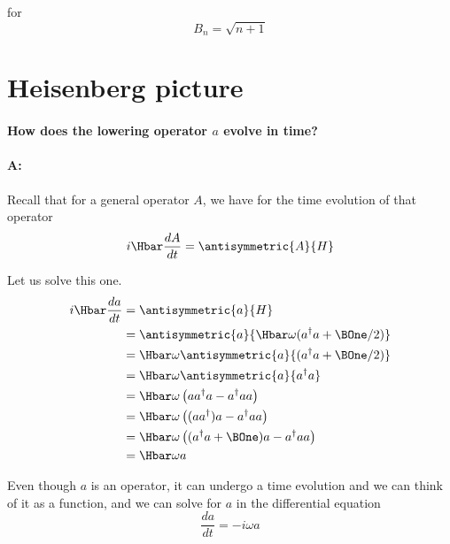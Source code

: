 for
\begin{equation}\label{eqn:PHY356FLecture11:260}
B_n = \sqrt{n + 1}
\end{equation}

\section{Heisenberg picture}

\paragraph{How does the lowering operator \(a\) evolve in time?}

\paragraph{A:} Recall that for a general operator \(A\), we have for the time evolution of that operator
%
\begin{equation}\label{eqn:PHY356FLecture11:270}
i \Hbar \frac{d A}{dt} = \antisymmetric{ A }{H}
\end{equation}

Let us solve this one.
%
\begin{equation}\label{eqn:lecture11harmonicOscillator:780}
\begin{aligned}
i \Hbar \frac{d a}{dt}
&= \antisymmetric{ a }{H} \\
&= \antisymmetric{ a }{ \Hbar \omega (a^\dagger a + \BOne/2) } \\
&= \Hbar\omega \antisymmetric{ a }{ (a^\dagger a + \BOne/2) } \\
&= \Hbar\omega \antisymmetric{ a }{ a^\dagger a } \\
&= \Hbar\omega \left( a a^\dagger a - a^\dagger a a \right) \\
&= \Hbar\omega \left( (a a^\dagger) a - a^\dagger a a \right) \\
&= \Hbar\omega \left( (a^\dagger a + \BOne) a - a^\dagger a a \right) \\
&= \Hbar\omega a
\end{aligned}
\end{equation}

Even though \(a\) is an operator, it can undergo a time evolution and we can think of it as a function, and we can solve for \(a\) in the differential equation
%
\begin{equation}\label{eqn:PHY356FLecture11:280}
\frac{d a}{dt} = -i \omega a
\end{equation}

